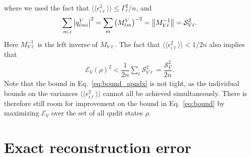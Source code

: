 \documentclass[a4paper,twocolumn,unpublished]{quantumarticle}
\newcommand{\f}[2]{\dfrac{#1}{#2}} %
\newcommand{\p}[1]{\left(#1\right)} %
\newcommand{\bbk}[1]{\langle\!\langle #1 \rangle\!\rangle}
\newcommand{\E}{\mathcal{E}}
\renewcommand{\S}{\mathcal{S}}
\begin{document}
where we used the fact that $\bbk{\epsilon_{i\ell}^2}\le\Gamma_\ell^2/n$, and
\begin{align}
  \sum_{m,i} \abs{q^V_{\ell mi}}^2
  = \sum_m \p{M^V_{\ell m}}^{-2}
  = \norm{M_{V\ell}^{-1}}
  = \S_{V\ell}^2.
\end{align}
Here $M_{V\ell}^{-1}$ is the left inverse of $M_{V\ell}$.
The fact that $\bbk{\epsilon_{i\ell}^2}<1/2n$ also implies that
\begin{align}
  \E_V\p{\rho}^2 < \f1{2n} \sum_\ell \S_{V\ell}^2 = \f{\S_V^2}{2n}.
\end{align}
Note that the bound in Eq.~\eqref{eq:bound_apndx} is not tight, as the individual bounds on the variances $\bbk{\epsilon_{i\ell}^2}$ cannot all be achieved simultaneously.
There is therefore still room for improvement on the bound in Eq.~\eqref{eq:bound} by maximizing $\E_V$ over the set of all qudit states $\rho$.

\section{Exact reconstruction error}
\label{sec:exact}
\end{document}
